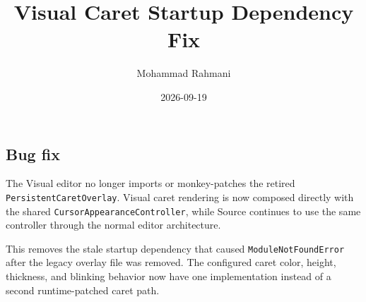 \documentclass[a4paper]{article}
\title{Visual Caret Startup Dependency Fix}
\date{2026-09-19}
\author{Mohammad Rahmani}
\begin{document}
\maketitle
\begin{preview}
\section{Bug fix}
The Visual editor no longer imports or monkey-patches the retired
\texttt{PersistentCaretOverlay}. Visual caret rendering is now composed directly
with the shared \texttt{CursorAppearanceController}, while Source continues to
use the same controller through the normal editor architecture.

This removes the stale startup dependency that caused
\texttt{ModuleNotFoundError} after the legacy overlay file was removed. The
configured caret color, height, thickness, and blinking behavior now have one
implementation instead of a second runtime-patched caret path.
\end{preview}
\end{document}
